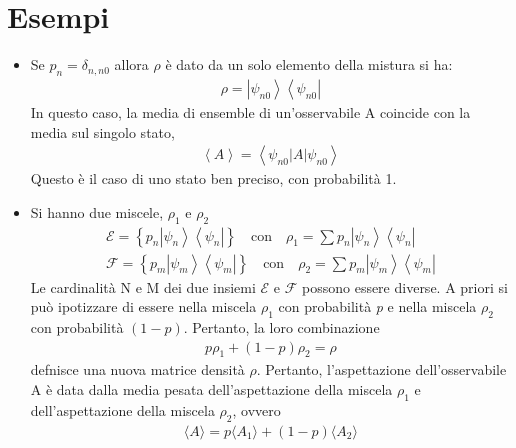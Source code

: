 \section{Esempi} %
\begin{itemize}
\item Se  $p_n=\delta_{n,n0}$ allora $\rho$ è dato da un solo elemento della mistura si ha:
\begin{equation}\begin{split}
\rho=\left |\psi _{n0} \right\rangle\left\langle \psi _{n0}\right |
\end{split}\end{equation}
In questo caso, la media di ensemble di un'osservabile A coincide con la media sul singolo stato,
\begin{equation}\begin{split}
\left\langle A \right\rangle=\left\langle \psi_{n0} |A|\psi_{n0} \right\rangle
\end{split}\end{equation}
Questo è il caso di uno stato ben preciso, con probabilità 1.

\item Si hanno due miscele, $\rho_1$ e $\rho_2$
\begin{equation}\begin{split}
\mathcal{E}=\left\{p_n\left |\psi _n \right\rangle\left\langle \psi _n\right |\right\} \quad \text{con} \quad \rho_1=\sum{p_n\left |\psi _n \right\rangle\left\langle \psi _n\right |} \\
\mathcal{F} = \left\{p_m\left |\psi _m \right\rangle\left\langle \psi _m\right |\right\} \quad \text{con} \quad \rho_2=\sum{p_m\left |\psi _m \right\rangle\left\langle \psi _m\right |}
\end{split}\end{equation}
Le cardinalità N e M dei due insiemi $\mathcal{E}$ e $\mathcal{F}$ possono essere diverse.
A priori si può ipotizzare di essere nella miscela $\rho_1$ con probabilità \emph{p} e nella miscela $\rho_2$ con probabilità $(1 - p)$. Pertanto, la loro combinazione
\begin{equation}\begin{split}
p\rho_1+(1-p)\rho_2=\rho
\end{split}\end{equation}
defnisce una nuova matrice densità $\rho$. Pertanto, l'aspettazione dell'osservabile A è data dalla media pesata dell'aspettazione della miscela $\rho_1$ e dell'aspettazione della miscela $\rho_2$, ovvero
\begin{equation}\begin{split}
\langle A \rangle = p\langle A_1 \rangle + (1-p)\langle A_2 \rangle
\end{split}\end{equation}


\end{itemize}
